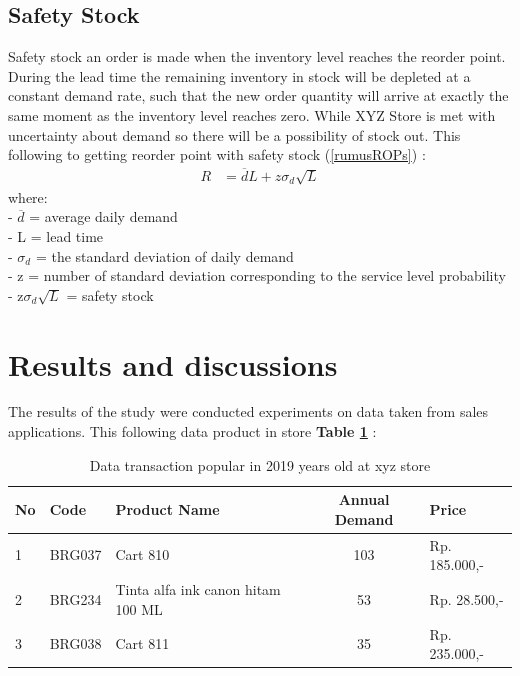 \documentclass[12pt,a4paper,final]{iopart}
\begin{document}
\subsection{Safety Stock}
Safety stock an order is made when the inventory level reaches the reorder point. During the lead time the remaining inventory in stock will be depleted at a constant demand rate, such that the new order quantity will arrive at exactly the same moment as the inventory level reaches zero. While XYZ Store is met with uncertainty about demand so there will be a possibility of stock out. This following to getting reorder point with safety stock (\ref{rumusROPs}) \cite{Rusell2011}:
\begin{eqnarray}
	\label{rumusROPs}
	R &= \overline{d}L + z\sigma_d\sqrt{L}
\end{eqnarray}
where:\\
- $\overline{d}$ = average daily demand\\
- L = lead time\\
- $\sigma_d$ = the standard deviation of daily demand\\
- z = number of standard deviation corresponding to the service level probability\\
- z$\sigma_d\sqrt{L}$ = safety stock

\section{Results and discussions}
The results of the study were conducted experiments on data taken from sales applications. This following data product in store \textbf{Table \ref{tableBarang}} :
\begin{table}[h!]
	\centering
	\caption{\label{tableBarang} Data transaction popular in 2019 years old at xyz store}
	\begin{tabular}{ lllcl }
		\hline
		\textbf{No} & \textbf{Code} & \textbf{Product Name} & \textbf{Annual Demand} & \textbf{Price} \\
		\hline
		1 & BRG037 & Cart 810 & 103 & Rp. 185.000,-  \\ 
		2 & BRG234 & Tinta alfa ink canon hitam 100 ML & 53 &  Rp. 28.500,-  \\ 
		3 & BRG038 & Cart 811 & 35 & Rp. 235.000,- \\ 
		\hline
	\end{tabular}
\end{table}
\end{document}
